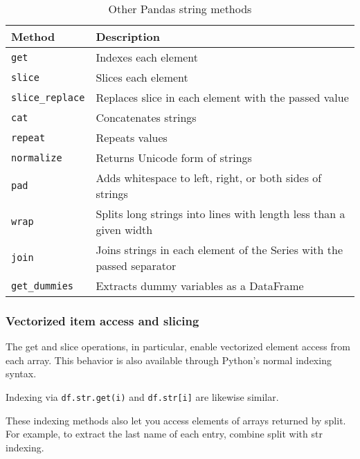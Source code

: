 \begin{table}

    \centering
    \caption{Other Pandas string methods}
    \label{tab22-2}
    \begin{tabular}{ll}
        \hline
        Method               & Description                                                           \\
        \hline
        \verb|get|           & Indexes each element                                                  \\
        \verb|slice|         & Slices each element                                                   \\
        \verb|slice_replace| & Replaces slice in each element with the passed value                  \\
        \verb|cat|           & Concatenates strings                                                  \\
        \verb|repeat|        & Repeats values                                                        \\
        \verb|normalize|     & Returns Unicode form of strings                                       \\
        \verb|pad|           & Adds whitespace to left, right, or both sides of strings              \\
        \verb|wrap|          & Splits long strings into lines with length less than a given width    \\
        \verb|join|          & Joins strings in each element of the Series with the passed separator \\
        \verb|get_dummies|   & Extracts dummy variables as a DataFrame                               \\
        \hline
    \end{tabular}
\end{table}
\subsubsection*{Vectorized item access and slicing}
The get and slice operations, in particular, enable vectorized element access from
each array. This behavior is also available through Python's normal
indexing syntax.

Indexing via \verb|df.str.get(i)| and \verb|df.str[i]| are likewise similar.

These indexing methods also let you access elements of arrays returned by split. For
example, to extract the last name of each entry, combine split with str indexing.


